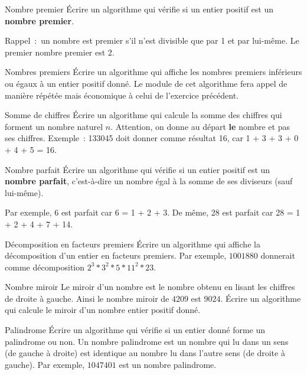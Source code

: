 	\begin{Exercice}{Nombre premier}
		Écrire un algorithme qui vérifie si un entier positif est un
		\textbf{nombre premier}. 
		
		Rappel~:~un nombre est premier s’il n’est divisible que par 1 et par
		lui-même. Le premier nombre premier est 2.
	\end{Exercice}
	
	\begin{Exercice}{Nombres premiers}
		Écrire un algorithme qui affiche les nombres premiers inférieurs ou
		égaux à un entier positif donné. Le module de cet algorithme fera appel
		de manière répétée mais économique à celui de l’exercice précédent.
	\end{Exercice}

	\begin{Exercice}{Somme de chiffres}
		Écrire un algorithme qui calcule la somme des chiffres qui forment un
		nombre naturel $n$. Attention, on donne au départ \textbf{le} nombre et
		pas ses chiffres. Exemple~: 133045 doit donner comme résultat 16,
		car 1 + 3 + 3 + 0 + 4 + 5 = 16.
	\end{Exercice}
	
	\begin{Exercice}{Nombre parfait}
		Écrire un algorithme qui vérifie si un entier positif est un
		\textbf{nombre parfait}, c’est-à-dire un nombre égal à la somme de ses
		diviseurs (sauf lui-même). 
		
		Par exemple, 6 est parfait car 6 = 1 + 2 + 3. 
		De même, 28 est parfait car 28 = 1 + 2 + 4 + 7 + 14.
	\end{Exercice}
	
	\begin{Exercice}{Décomposition en facteurs premiers}
		Écrire un algorithme qui affiche la décomposition 
		d’un entier en facteurs premiers. 
		Par exemple, $1001880$ donnerait comme décomposition
		$2^3 * 3^2 * 5 * 11^2 * 23$.
	\end{Exercice}

	\begin{Exercice}{Nombre miroir}
		Le miroir d'un nombre est le nombre obtenu
		en lisant les chiffres de droite à gauche.
		Ainsi le nombre miroir de $4209$ est $9024$.
		Écrire un algorithme qui calcule le miroir
		d'un nombre entier positif donné.
	\end{Exercice}
	
	\begin{Exercice}{Palindrome}
		Écrire un algorithme qui vérifie si un entier donné 
		forme un palindrome ou non. 
		Un nombre palindrome est un nombre qui lu dans un sens 
		(de gauche à droite) est identique au nombre lu dans l’autre sens 
		(de droite à gauche). 
		Par exemple, $1047401$ est un nombre palindrome.
	\end{Exercice}
	
